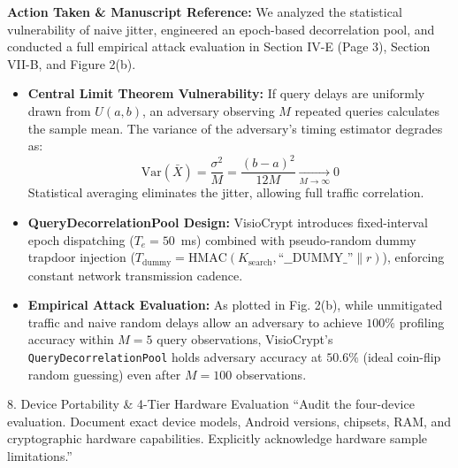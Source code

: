 \documentclass[11pt,a4paper]{article}
\begin{document}
\begin{responsebox}
\textbf{Action Taken \& Manuscript Reference:} We analyzed the statistical vulnerability of naive jitter, engineered an epoch-based decorrelation pool, and conducted a full empirical attack evaluation in Section IV-E (Page 3), Section VII-B, and Figure 2(b).

\begin{itemize}[itemsep=2pt]
    \item \textbf{Central Limit Theorem Vulnerability:} If query delays are uniformly drawn from $U(a, b)$, an adversary observing $M$ repeated queries calculates the sample mean. The variance of the adversary's timing estimator degrades as:
    \begin{equation}
    \text{Var}(\bar{X}) = \frac{\sigma^2}{M} = \frac{(b - a)^2}{12 M} \xrightarrow[M \to \infty]{} 0
    \end{equation}
    Statistical averaging eliminates the jitter, allowing full traffic correlation.
    \item \textbf{QueryDecorrelationPool Design:} VisioCrypt introduces fixed-interval epoch dispatching ($T_e = 50$~ms) combined with pseudo-random dummy trapdoor injection ($T_{\text{dummy}} = \text{HMAC}(K_{\text{search}}, \text{``\_\_DUMMY\_''}\parallel r)$), enforcing constant network transmission cadence.
    \item \textbf{Empirical Attack Evaluation:} As plotted in Fig. 2(b), while unmitigated traffic and naive random delays allow an adversary to achieve $100\%$ profiling accuracy within $M = 5$ query observations, VisioCrypt's \texttt{QueryDecorrelationPool} holds adversary accuracy at $50.6\%$ (ideal coin-flip random guessing) even after $M = 100$ observations.
\end{itemize}
\end{responsebox}

\vspace{1em}

\begin{reviewbox}{8. Device Portability \& 4-Tier Hardware Evaluation}
``Audit the four-device evaluation. Document exact device models, Android versions, chipsets, RAM, and cryptographic hardware capabilities. Explicitly acknowledge hardware sample limitations.''
\end{reviewbox}
\end{document}
